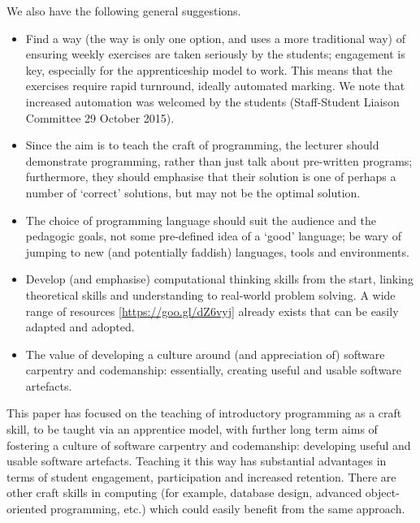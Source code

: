 \documentclass[conference,compsoc]{IEEEtran}
\begin{document}
We also have the following general suggestions.
\begin{itemize}
	\item	Find a way (the \BathM{} way is only one option, and \BathC{} uses a more traditional way) of ensuring weekly exercises are taken seriously by the students; engagement is key, especially for the apprenticeship model to work. This means that the exercises require rapid turnround, ideally automated marking. We note that increased automation was welcomed by the \BathC{} students (Staff-Student Liaison Committee 29 October 2015).
	\item	Since the aim is to teach the craft of programming, the lecturer should demonstrate programming, rather than just talk about pre-written programs; furthermore, they should emphasise that their solution is one of perhaps a number of `correct' solutions, but may not be the optimal solution.
	\item	The choice of programming language should suit the audience and the pedagogic goals, not some pre-defined idea of a `good' language; be wary of jumping to new (and potentially faddish) languages, tools and environments.
	\item	Develop (and emphasise) computational thinking skills from the start, linking theoretical skills and understanding to real-world problem solving. A wide range of resources [\url{https://goo.gl/dZ6vyj}] already exists that can be easily adapted and adopted.
	\item	The value of developing a culture around (and appreciation of) software carpentry and codemanship: essentially, creating useful and usable software artefacts.
\end{itemize} 

This paper has focused on the teaching of introductory programming as
a craft skill, to be taught via an apprentice model, with further long
term aims of fostering a culture of software carpentry and
codemanship: developing useful and usable software artefacts. Teaching
it this way has substantial advantages in terms of student engagement,
participation and increased retention. There are other craft skills in
computing (for example, database design, advanced object-oriented
programming, etc.) which could easily benefit from the same approach.
\end{document}
